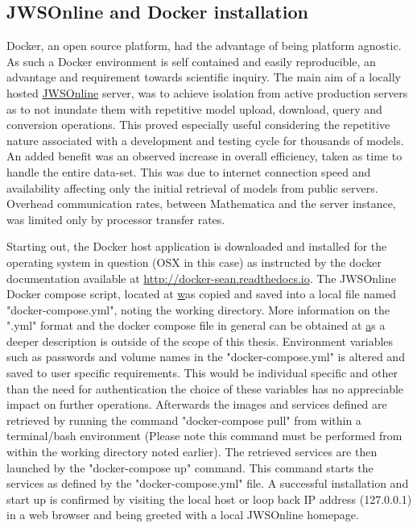 \subsection{JWSOnline and Docker installation} \label{Docker Installation}
Docker, an open source platform, had the advantage of being platform agnostic. As such a Docker environment is self contained and easily reproducible, an advantage and requirement towards scientific inquiry. The main aim of a locally hosted \href{https://jjj.bio.vu.nl}{JWSOnline} server, was to achieve isolation from active production servers as to not inundate them with repetitive model upload, download, query and conversion operations. This proved especially useful considering the repetitive nature associated with a development and testing cycle for thousands of models. An added benefit was an observed increase in overall efficiency, taken as time to handle the entire data-set. This was due to internet connection speed and availability affecting only the initial retrieval of models from public servers. Overhead communication rates, between Mathematica and the server instance, was limited only by processor transfer rates. 

Starting out, the Docker host application is downloaded and installed for the operating system in question (OSX in this case) as instructed by the docker documentation available at \href{http://docker-sean.readthedocs.io}{http://docker-sean.readthedocs.io}. The JWSOnline Docker compose script, located at \href{http://jws-docs.readthedocs.io/10_docker.html#building-the-jws-online-docker-image} was copied and saved into a local file named "docker-compose.yml", noting the working directory. More information on the ".yml" format and the docker compose file in general can be obtained at \href{https://docs.docker.com/compose/compose-file/#compose-file-structure-and-examples} as a deeper description is outside of the scope of this thesis. 
Environment variables such as passwords and volume names in the "docker-compose.yml" is altered and saved to user specific requirements. This would be individual specific and other than the need for authentication the choice of these variables has no appreciable impact on further operations. Afterwards the images and services defined are retrieved by running the command "docker-compose pull" from within a terminal/bash environment (Please note this command must be performed from within the working directory noted earlier). The retrieved services are then launched by the "docker-compose up" command. This command starts the services as defined by the "docker-compose.yml" file. A successful installation and start up is confirmed by visiting the local host or loop back IP address (127.0.0.1) in a web browser and being greeted with a local JWSOnline homepage.

